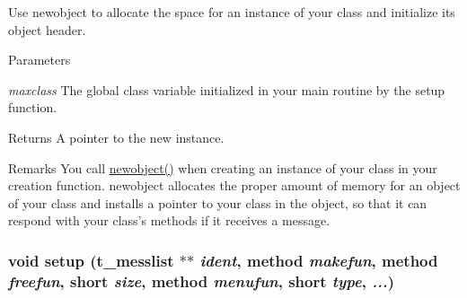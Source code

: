 Use newobject to allocate the space for an instance of your class and initialize its object header. 
\begin{DoxyParams}{Parameters}
\item[{\em maxclass}]The global class variable initialized in your main routine by the setup function. \end{DoxyParams}
\begin{DoxyReturn}{Returns}
A pointer to the new instance.
\end{DoxyReturn}
\begin{DoxyRemark}{Remarks}
You call \hyperlink{group__class__old_ga053f428d5edcc7d663980330848e73a6}{newobject()} when creating an instance of your class in your creation function. newobject allocates the proper amount of memory for an object of your class and installs a pointer to your class in the object, so that it can respond with your class’s methods if it receives a message. 
\end{DoxyRemark}
\hypertarget{group__class__old_ga24bbc5a9e8f7bb0a1c6847326e2f0a20}{
\subsubsection[{setup}]{\setlength{\rightskip}{0pt plus 5cm}void setup ({\bf t\_\-messlist} $\ast$$\ast$ {\em ident}, \/  {\bf method} {\em makefun}, \/  {\bf method} {\em freefun}, \/  short {\em size}, \/  {\bf method} {\em menufun}, \/  short {\em type}, \/   {\em ...})}}
\label{group__class__old_ga24bbc5a9e8f7bb0a1c6847326e2f0a20}


